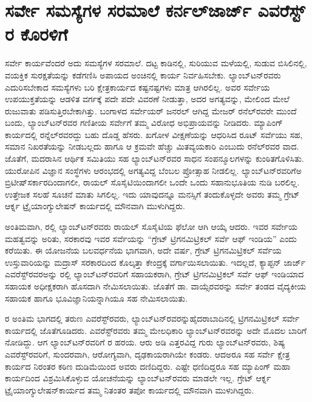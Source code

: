 
\chapter{ಸರ್ವೇ ಸಮಸ್ಯೆಗಳ ಸರಮಾಲೆ ಕರ್ನಲ್​ ಜಾರ್ಜ್ ಎವರೆಸ್ಟ್​ರ ಕೊರಳಿಗೆ}

ಸರ್ವೇ ಕಾರ್ಯವೆಂದರೆ ಅದು ಸಮಸ್ಯೆಗಳ ಸರಮಾಲೆ. ದಟ್ಟ ಕಾಡಿನಲ್ಲಿ, ಸುರಿಯುವ ಮಳೆಯಲ್ಲಿ, ಸುಡುವ ಬಿಸಿಲಿನಲ್ಲಿ, ವಯಕ್ತಿಕ ಸುರಕ್ಷತೆಯನ್ನು ಕಡೆಗಣಿಸಿ ಅಪಾಯದ ಅಂಚಿನಲ್ಲಿ ಕಾರ್ಯ ನಿರ್ವಹಿಸಬೇಕು. ಲ್ಯಾಂಬ್​ಟನ್​ರವರು ಎದುರಿಸಬೇಕಾದ ಸಮಸ್ಯೆಗಳು ಬರಿ ಕ್ಷೇತ್ರಕಾರ್ಯದ ಕಷ್ಟನಷ್ಟಗಳು ಮಾತ್ರ ಆಗಿರಲಿಲ್ಲ. ಅವರ ಸರ್ವೇಯ ಉಪಯುಕ್ತತೆಯನ್ನು ಆಡಳಿತ ವರ್ಗಕ್ಕೆ ಪದೇ ಪದೇ ವಿವರಣೆ ನೀಡುತ್ತಾ, ಅದರ ಅಗತ್ಯವನ್ನು, ಮೇಲಿಂದ ಮೇಲೆ ರುಜುವಾತು ಪಡಿಸುತ್ತಿರಬೇಕಾಗಿತ್ತು. ಬಂಗಾಳದ ಸರ್ವೇಯರ್​ ಜನರಲ್​ ಆಗಿದ್ದ ಮೇಜರ್​ ರನೆಲ್​ರವರೇ ಮುಂದೆ ಬಂದು, ಲ್ಯಾಂಬ್​ಟನ್​ರವರ ಗಣಿತೀಯ ಸರ್ವೇಗೆ ತಮ್ಮ ವಿರೋಧ ಅಭಿಪ್ರಾಯವನ್ನು ನೀಡಿದರು. ಮ್ಯಾಪಿಂಗ್​ ಕಾರ್ಯದಲ್ಲಿ ರನ್ನೆಲ್​ರವರದ್ದು ಬಹು ದೊಡ್ಡ ಹೆಸರು. ಖಗೋಳ ವೀಕ್ಷಣೆಯನ್ನು ಆಧರಿಸಿದ ರೂಟ್​ ಸರ್ವೆಯು ಸಹ, ಸಮಾನ ನಿಖರತೆಯನ್ನು ನೀಡಬಲ್ಲದು ಹಾಗೂ ಆ ಕ್ರಮವೇ ಹೆಚ್ಚು ಮಿತವ್ಯಯಕಾರಿ ಎಂಬುದು ರನೆಲ್​ರವರ ವಾದ. ಜೊತೆಗೆ, ಮದರಾಸಿನ ಆರ್ಥಿಕ ಸಮಿತಿಯು ಸಹ ಲ್ಯಾಂಬ್​ಟನ್​ರವರ ಸಾಧನ ಸಂಪನ್ಮೂಲಗಳನ್ನು ಕುಂಠಿತಗೊಳಿಸಿತು. ಯುರೋಪಿನ ವಿಜ್ಞಾನ ಸಂಸ್ಥೆಗಳು ಆರಂಭದಲ್ಲಿ ಅಗತ್ಯವಿದ್ದ ಬೆಂಬಲ ಪ್ರೋತ್ಸಾಹ ನೀಡಲಿಲ್ಲ. ಲ್ಯಾಂಬ್​ಟನ್​ರವರಿಗೆಅ ಬ್ರಿಟೀಷ್​ ಸರ್ಕಾರದಿಂದಾಗಲೀ, ರಾಯಲ್​ ಸೊಸೈಟಿಯಿಂದಾಗಲೀ ಒಂದೇ ಒಂದು ಸಹಾನುಭೂತಿಯ ನುಡಿ ಬರಲಿಲ್ಲ. ಉತ್ತೇಜಕ ಸಲಹೆ ಸೂಚನೆ ಮಾತು ಸಿಗಲಿಲ್ಲ. ಇದು ಯಾವುದನ್ನೂ ಮನಸ್ಸಿಗೆ ತಂದುಕೊಳ್ಳದೇ ಅವರು ತಮ್ಮ ಗ್ರೇಟ್​ ಆರ್ಕ್ನ ಟ್ರೈಯಾಂಗ್ಯುಲೇಷನ್​ ಕಾರ್ಯದಲ್ಲಿ ಮೌನವಾಗಿ ಮುಳುಗಿದ್ದರು.

ಅಂತಿಮವಾಗಿ, ರಲ್ಲಿ ಲ್ಯಾಂಬ್​ಟನ್​ರವರು ರಾಯಲ್​ ಸೊಸೈಟಿಯ ಫೆಲೋ ಆಗಿ ಆಯ್ಕೆ ಆದರು. ಇವರ ಸರ್ವೇಯ ಮಹತ್ವವನ್ನು ಅರಿತು, ಸರಕಾರವು ಇವರ ಸರ್ವೆಯನ್ನು “ಗ್ರೇಟ್​ ಟ್ರಿಗನಮಿಟ್ರಿಕಲ್​ ಸರ್ವೆ ಆಫ್​ ಇಂಡಿಯ” ಎಂದು ಕರೆಯಿತು. ಈ ಯೋಜನೆಯ ಬಲವರ್ಧನೆಯ ಭಾಗವಾಗಿ, ಅದೇ ವರ್ಷ, ಗ್ರೇಟ್​ ಟ್ರಿಗನಮಿಟ್ರಿಕಲ್​ ಸರ್ವೆಯ ಉಸ್ತುವಾರಿಯನ್ನು ಮದ್ರಾಸ್​ ಸರಕಾರದಿಂದ ಕೊಲ್ಕತ್ತಾ ಕೇಂದ್ರಕ್ಕೆ ವರ್ಗಾಯಿಸಲಾಯಿತು. ಇದಲ್ಲದೆ, ಕ್ಯಾಪ್ಟನ್​ ಜಾರ್ಜ್ ಎವರೆಸ್ಟ್​ರವರಅನ್ನು  ರಲ್ಲಿ ಲ್ಯಾಂಬ್​ಟನ್​ರವರಿಗೆ ಸಹಾಯಕರಾಗಿ, ಗ್ರೇಟ್​ ಟ್ರಿಗನಮಿಟ್ರಿಕಲ್​ ಸರ್ವೆ ಆಫ್​ ಇಂಡಿಯಾದ ಸಹಾಯಕ ಅಧೀಕ್ಷಕರಾಗಿ ಹೊಸದಾಗಿ ನೇಮಿಸಲಾಯಿತು. ಜೊತೆಗೆ ಡಾ. ವಾಯ್ಸೆರವರನ್ನು ಸರ್ವೇ ತಂಡದ ವೈದ್ಯಕೀಯ ಸಹಾಯಕ ಹಾಗೂ ಭೂವಿಜ್ಞಾನಿಯನ್ನಾಗಿಯೂ ಸಹ ನೇಮಿಸಲಾಯಿತು.

ರ ಅಂತಿಮ ಭಾಗದಲ್ಲಿ ತರುಣ ಎವರೆಸ್ಟ್​ರವರು, ಲ್ಯಾಂಬ್​ಟನ್​ರವರನ್ನು\break ಹೈದರಾಬಾದಿನಲ್ಲಿ ಟ್ರಿಗನಮಿಟ್ರಿಕಲ್​ ಸರ್ವೇ ಕಾರ್ಯದಲ್ಲಿ ಜೊತೆಗೂಡಿದರು. ಎವರೆಸ್ಟ್​ರವರು ತಮ್ಮ ಮೇಲಧಿಕಾರಿ ಲ್ಯಾಂಬ್​ಟನ್​ರವರನ್ನು ಅದೇ ಮೊದಲ ಬಾರಿಗೆ ನೋಡಿದ್ದು. ಆಗ ಲ್ಯಾಂಬ್​ಟನ್​ರವರಿಗೆ ರ ಹರಯ. ಆರು ಅಡಿ ಎತ್ತರವಿದ್ದ ಗುರು ಲ್ಯಾಂಬ್​ಟನ್​ರವರು, ಶಿಷ್ಯ ಎವರೆಸ್ಟ್​ರವರಿಗೆ, ಸುಂದರವಾಗಿ, ಆರೋಗ್ಯವಾಗಿ, ದೃಢಕಾಯರಾಗಿಯೇ ಕಂಡರು. ಆದಅರೂ ಸಹ ಸರ್ವೇ ಕ್ಷೇತ್ರ ಕಾರ್ಯದ ನಿರಂತರ ಕಠಿಣ ದುಡಿಮೆಯಿಂದ ಅವರು ದಣಿದಿದ್ದರು. ಎಷ್ಟೇ ಧಣಿದಿದ್ದರೂ ಸಹ ಮ್ಯಾಪಿಂಗ್​ ಮಹಾ ಕಾರ್ಯದಿಂದ ವಿಶ್ರಮಿಸಿಕೊಳ್ಳುವ ಯೋಚನೆಯನ್ನು ಲ್ಯಾಂಬ್​ಟನ್​ರವರು ಮಾಡಲೇ ಇಲ್ಲ. ಗ್ರೇಟ್​ ಆರ್ಕ್ನ ಟ್ರೈಯಾಂಗ್ಯುಲೇಷನ್​ ಕಾರ್ಯದ ತಮ್ಮ ನಿತಂತರ ತಪೋ ಕಾರ್ಯದಲ್ಲಿ ಮೌನವಾಗಿ ಮುಳುಗಿದ್ದರು.

